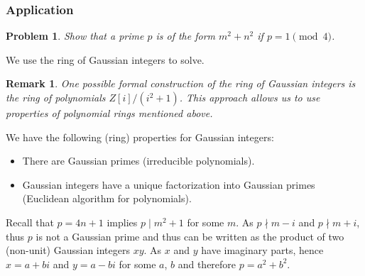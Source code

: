 \documentclass{article}
\newtheorem*{remark}{Remark}
\newtheorem*{problem}{Problem}
\begin{document}
\subsubsection{Application}
\begin{problem}
    Show that a prime $p$ is of the form $m^{2} + n^{2}$ if $p = 1 \pmod{4}$.
\end{problem}
We use the ring of Gaussian integers to solve.
\begin{remark}
    One possible formal construction of the ring of Gaussian integers is the ring of polynomials $Z[i]/(i^{2}+1)$. This approach allows us to use properties of polynomial rings mentioned above.
\end{remark}
 We have the following (ring) properties for Gaussian integers:
\begin{itemize}
    \item There are Gaussian primes (irreducible polynomials).
    \item Gaussian integers have a unique factorization into Gaussian primes (Euclidean algorithm for polynomials).
\end{itemize}
Recall that $p = 4n + 1$ implies $p \mid m^{2} + 1$ for some $m$. As $p \nmid m - i$ and $p \nmid m + i$, thus $p$ is not a Gaussian prime and thus can be written as the product of two (non-unit) Gaussian integers $xy$. As $x$ and $y$ have imaginary parts, hence $x = a + bi$ and $y = a - bi$ for some $a$, $b$ and therefore $p = a^{2} + b^{2}$.
\end{document}
